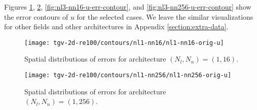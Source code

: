 Figures \ref{fig:nl1-nn16-u-err-contour},  \ref{fig:nl1-nn256-u-err-contour}, \ref{fig:nl3-nn16-u-err-contour}, and \ref{fig:nl3-nn256-u-err-contour} show the error contours of $u$ for the selected cases.
We leave the similar visualizations for other fields and other architectures in Appendix \ref{section:extra-data}.

\begin{figure}[H]
    \centering%
\end{figure}

\begin{figure}[H]
    \texttt{[image: tgv-2d-re100/contours/nl1-nn16/nl1-nn16-orig-u]}
    \caption{Spatial distributions of errors for architecture $(N_l, N_n)=(1, 16)$.}\label{fig:nl1-nn16-u-err-contour}
\end{figure}

\begin{figure}[H]
    \texttt{[image: tgv-2d-re100/contours/nl1-nn256/nl1-nn256-orig-u]}
    \caption{Spatial distributions of errors for architecture $(N_l, N_n)=(1, 256)$.}\label{fig:nl1-nn256-u-err-contour}
\end{figure}

